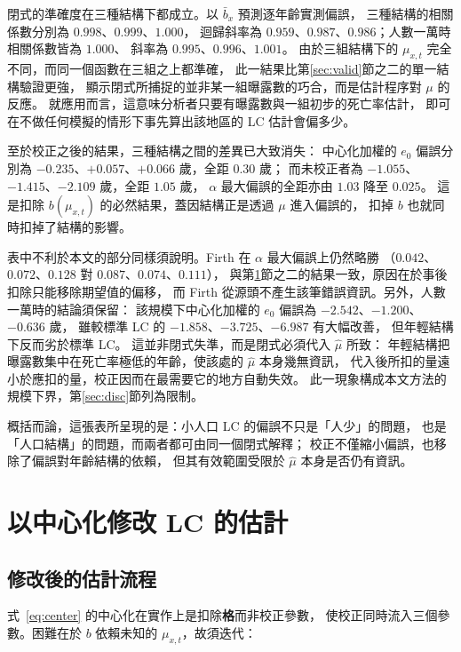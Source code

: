 \documentclass[UTF8, fontset=macnew, a4paper, 12pt]{ctexart}
\begin{document}
閉式的準確度在三種結構下都成立。以 $\bar b_x$ 預測逐年齡實測偏誤，
三種結構的相關係數分別為 $0.998$、$0.999$、$1.000$，
迴歸斜率為 $0.959$、$0.987$、$0.986$；人數一萬時相關係數皆為 $1.000$、
斜率為 $0.995$、$0.996$、$1.001$。
由於三組結構下的 $\mu_{x,t}$ 完全不同，而同一個函數在三組之上都準確，
此一結果比第\ref{sec:valid}節之二的單一結構驗證更強，
顯示閉式所捕捉的並非某一組曝露數的巧合，而是估計程序對 $\mu$ 的反應。
就應用而言，這意味分析者只要有曝露數與一組初步的死亡率估計，
即可在不做任何模擬的情形下事先算出該地區的 LC 估計會偏多少。

至於校正之後的結果，三種結構之間的差異已大致消失：
中心化加權的 $e_0$ 偏誤分別為 $-0.235$、$+0.057$、$+0.066$ 歲，全距 $0.30$ 歲；
而未校正者為 $-1.055$、$-1.415$、$-2.109$ 歲，全距 $1.05$ 歲，
$\alpha$ 最大偏誤的全距亦由 $1.03$ 降至 $0.025$。
這是扣除 $b(\mu_{x,t})$ 的必然結果，蓋因結構正是透過 $\mu$ 進入偏誤的，
扣掉 $b$ 也就同時扣掉了結構的影響。

表中不利於本文的部分同樣須說明。Firth 在 $\alpha$ 最大偏誤上仍然略勝
（$0.042$、$0.072$、$0.128$ 對 $0.087$、$0.074$、$0.111$），
與第\ref{sec:result}節之二的結果一致，原因在於事後扣除只能移除期望值的偏移，
而 Firth 從源頭不產生該筆錯誤資訊。另外，人數一萬時的結論須保留：
該規模下中心化加權的 $e_0$ 偏誤為 $-2.542$、$-1.200$、$-0.636$ 歲，
雖較標準 LC 的 $-1.858$、$-3.725$、$-6.987$ 有大幅改善，
但年輕結構下反而劣於標準 LC。
這並非閉式失準，而是閉式必須代入 $\hat\mu$ 所致：
年輕結構把曝露數集中在死亡率極低的年齡，使該處的 $\hat\mu$ 本身幾無資訊，
代入後所扣的量遠小於應扣的量，校正因而在最需要它的地方自動失效。
此一現象構成本文方法的規模下界，第\ref{sec:disc}節列為限制。

概括而論，這張表所呈現的是：小人口 LC 的偏誤不只是「人少」的問題，
也是「人口結構」的問題，而兩者都可由同一個閉式解釋；
校正不僅縮小偏誤，也移除了偏誤對年齡結構的依賴，
但其有效範圍受限於 $\hat\mu$ 本身是否仍有資訊。

\section{以中心化修改 LC 的估計}\label{sec:result}

\subsection{修改後的估計流程}

式~\eqref{eq:center} 的中心化在實作上是扣除\textbf{格}而非校正參數，
使校正同時流入三個參數。困難在於 $b$ 依賴未知的 $\mu_{x,t}$，故須迭代：
\end{document}
